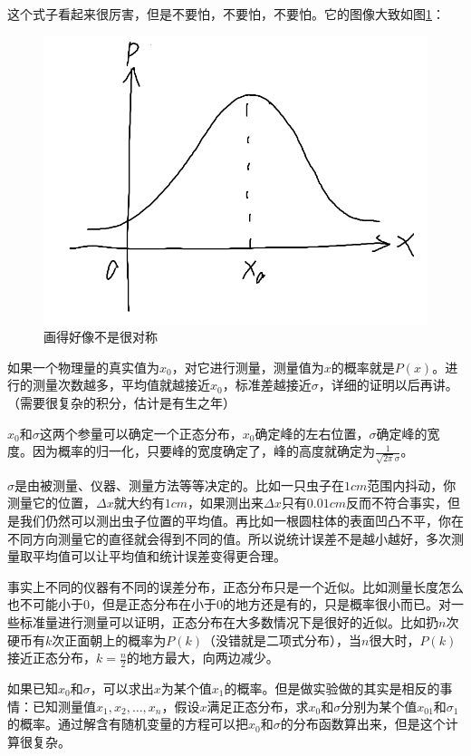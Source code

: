 这个式子看起来很厉害，但是不要怕，不要怕，不要怕。它的图像大致如图\ref{fig-gaussian}：
\begin{figure}[htb]
\centering
\includegraphics[scale=0.5]{fig/gaussian}
\caption{画得好像不是很对称}
\label{fig-gaussian}
\end{figure}

如果一个物理量的真实值为$x_0$，对它进行测量，测量值为$x$的概率就是$P(x)$。进行的测量次数越多，平均值就越接近$x_0$，标准差越接近$\sigma$，详细的证明以后再讲。（需要很复杂的积分，估计是有生之年）

$x_0$和$\sigma$这两个参量可以确定一个正态分布，$x_0$确定峰的左右位置，$\sigma$确定峰的宽度。因为概率的归一化，只要峰的宽度确定了，峰的高度就确定为$\frac{1}{\sqrt{2 \pi} \sigma}$。

$\sigma$是由被测量、仪器、测量方法等等决定的。比如一只虫子在$1 \unit{cm}$范围内抖动，你测量它的位置，$\Delta x$就大约有$1 \unit{cm}$，如果测出来$\Delta x$只有$0.01 \unit{cm}$反而不符合事实，但是我们仍然可以测出虫子位置的平均值。再比如一根圆柱体的表面凹凸不平，你在不同方向测量它的直径就会得到不同的值。所以说统计误差不是越小越好，多次测量取平均值可以让平均值和统计误差变得更合理。

事实上不同的仪器有不同的误差分布，正态分布只是一个近似。比如测量长度怎么也不可能小于$0$，但是正态分布在小于$0$的地方还是有的，只是概率很小而已。对一些标准量进行测量可以证明，正态分布在大多数情况下是很好的近似。比如扔$n$次硬币有$k$次正面朝上的概率为$P(k)$（没错就是二项式分布），当$n$很大时，$P(k)$接近正态分布，$k=\frac{n}{2}$的地方最大，向两边减少。

如果已知$x_0$和$\sigma$，可以求出$x$为某个值$x_1$的概率。但是做实验做的其实是相反的事情：已知测量值$x_1,x_2,\dots,x_n$，假设$x$满足正态分布，求$x_0$和$\sigma$分别为某个值$x_{0 1}$和$\sigma_1$的概率。通过解含有随机变量的方程可以把$x_0$和$\sigma$的分布函数算出来，但是这个计算很复杂。


